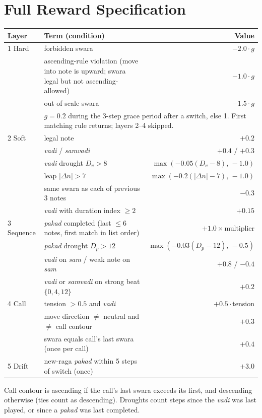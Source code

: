 \documentclass[11pt]{article}
\newcommand{\sw}[1]{\textit{#1}}  %
\begin{document}
\appendix

\section{Full Reward Specification}
\label{app:reward}
\begin{table}[h]
\centering\small
\begin{tabular}{@{}llr@{}}
\toprule
Layer & Term (condition) & Value \\
\midrule
1 Hard & forbidden swara & $-2.0\cdot g$ \\
 & ascending-rule violation (move into note is upward; swara legal but not ascending-allowed) & $-1.0\cdot g$ \\
 & out-of-scale swara & $-1.5\cdot g$ \\
 & \multicolumn{2}{l}{\footnotesize $g=0.2$ during the 3-step grace period after a switch, else 1. First matching rule returns; layers 2--4 skipped.} \\
2 Soft & legal note & $+0.2$ \\
 & \sw{vadi} / \sw{samvadi} & $+0.4$ / $+0.3$ \\
 & \sw{vadi} drought $D_v>8$ & $\max(-0.05(D_v-8),\,-1.0)$ \\
 & leap $|\Delta n|>7$ & $\max(-0.2(|\Delta n|-7),\,-1.0)$ \\
 & same swara as each of previous 3 notes & $-0.3$ \\
 & \sw{vadi} with duration index $\ge 2$ & $+0.15$ \\
3 Sequence & \sw{pakad} completed (last $\le 6$ notes, first match in list order) & $+1.0\times$multiplier \\
 & \sw{pakad} drought $D_p>12$ & $\max(-0.03(D_p-12),\,-0.5)$ \\
 & \sw{vadi} on \sw{sam} / weak note on \sw{sam} & $+0.8$ / $-0.4$ \\
 & \sw{vadi} or \sw{samvadi} on strong beat $\{0,4,12\}$ & $+0.2$ \\
4 Call & tension $>0.5$ and \sw{vadi} & $+0.5\cdot$tension \\
 & move direction $\neq$ neutral and $\neq$ call contour & $+0.3$ \\
 & swara equals call's last swara (once per call) & $+0.4$ \\
5 Drift & new-raga \sw{pakad} within 5 steps of switch (once) & $+3.0$ \\
\bottomrule
\end{tabular}
\end{table}
Call contour is ascending if the call's last swara exceeds its first, and descending otherwise (ties count as descending). Droughts count steps since the \sw{vadi} was last played, or since a \sw{pakad} was last completed.
\end{document}
